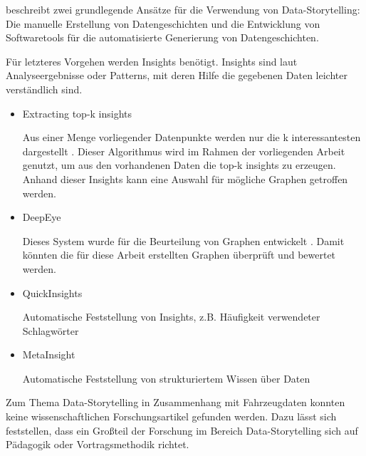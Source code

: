 \cite{Daradkeh.2023} beschreibt zwei grundlegende Ansätze für die Verwendung von Data-Storytelling: Die manuelle Erstellung von Datengeschichten und die Entwicklung von Softwaretools für die automatisierte Generierung von Datengeschichten.

Für letzteres Vorgehen werden Insights benötigt. Insights sind laut \cite{HewlettPackardEnterpriseDevelopmentLP.2023} Analyseergebnisse oder Patterns, mit deren Hilfe die gegebenen Daten leichter verständlich sind.

\begin{itemize}
    \item Extracting top-k insights\hfill

    Aus einer Menge vorliegender Datenpunkte werden nur die k \glqq interessantesten\grqq{} dargestellt \cite{Tang.2017}. Dieser Algorithmus wird im Rahmen der vorliegenden Arbeit genutzt, um aus den vorhandenen Daten die \glqq top-k insights\grqq{} zu erzeugen. Anhand dieser Insights kann eine Auswahl für mögliche Graphen getroffen werden.
    
    \item DeepEye\hfill

    Dieses System wurde für die Beurteilung von Graphen entwickelt \cite{Luo.2018}. Damit könnten die für diese Arbeit erstellten Graphen überprüft und bewertet werden.
    
    \item QuickInsights\hfill

    Automatische Feststellung von Insights, z.B. Häufigkeit verwendeter Schlagwörter
    
    \item MetaInsight\hfill

    Automatische Feststellung von strukturiertem Wissen über Daten
\end{itemize}

Zum Thema Data-Storytelling in Zusammenhang mit Fahrzeugdaten konnten keine wissenschaftlichen Forschungsartikel gefunden werden. Dazu lässt sich feststellen, dass ein Großteil der Forschung im Bereich Data-Storytelling sich auf Pädagogik oder Vortragsmethodik richtet.

